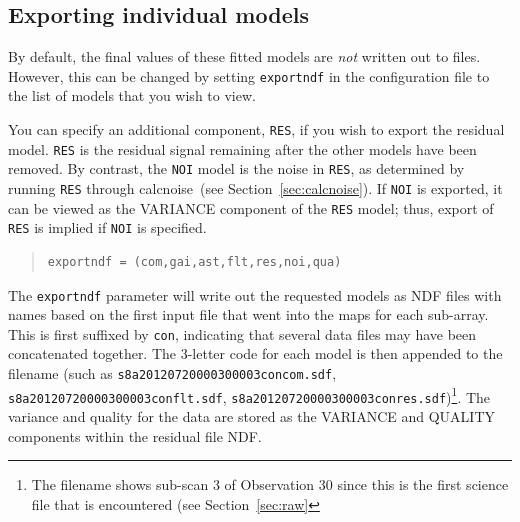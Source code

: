\documentclass[twoside,11pt]{article}
\newcommand{\xref}[3]{#1}
\newcommand{\xlabel}[1]{}
\renewcommand{\_}{\texttt{\symbol{95}}}
\newenvironment{myquote}{\begin{quote}\begin{small}}{\end{small}\end{quote}}
\newcommand{\task}[1]{\textsf{#1}}
\newcommand{\calcnoise}{\xref{\task{calcnoise}}{sun258}{CALCNOISE}}
\begin{document}
\subsection{\xlabel{export}Exporting individual models}
\label{sec:export}

By default, the final values of these fitted models are {\em not}
written out to files. However, this can be changed by setting
\texttt{exportndf} in the configuration file to the list of models
that you wish to view.

You can specify an additional component, \texttt{RES}, if you wish to export
the residual model. \texttt{RES} is the residual signal remaining
after the other models have been removed. By contrast, the
\texttt{NOI} model is the noise in \texttt{RES}, as determined by
running \texttt{RES} through \calcnoise\ (see
Section~\ref{sec:calcnoise}). If \texttt{NOI} is exported, it can be
viewed as the VARIANCE component of the \texttt{RES} model; thus,
export of \texttt{RES} is implied if \texttt{NOI} is specified.

\vspace{0cm}
\begin{myquote}
\begin{verbatim}
exportndf = (com,gai,ast,flt,res,noi,qua)
\end{verbatim}
\end{myquote}
\vspace{0cm}
The \texttt{exportndf} parameter will write out the requested models
as NDF files with names based on the first input file that went into
the maps for each sub-array. This is first suffixed by \texttt{con},
indicating that several data files may have been concatenated
together. The 3-letter code for each model is then appended to the filename (such as
\texttt{s8a20120720\_00030\_0003\_con\_com.sdf},
\linebreak
\texttt{s8a20120720\_00030\_0003\_con\_flt.sdf},
\texttt{s8a20120720\_00030\_0003\_con\_res.sdf})\footnote{The filename shows
sub-scan 3 of Observation 30 since this is the first science file that
is encountered (see Section~\ref{sec:raw}}. The variance
and quality for the data are stored as the VARIANCE and QUALITY
components within the residual file NDF.
\end{document}
